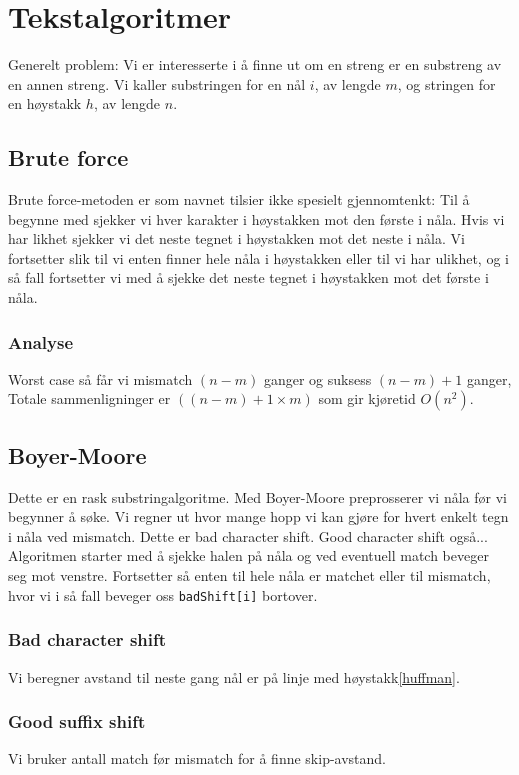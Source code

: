 \section{\color{red}Tekstalgoritmer}
	Generelt problem: Vi er interesserte i å finne ut om en streng er en substreng av en annen streng. Vi kaller substringen for en nål $i$, av lengde $m$, og stringen for en høystakk $h$, av lengde $n$.

	\subsection{Brute force}
		Brute force-metoden er som navnet tilsier ikke spesielt gjennomtenkt: Til å begynne med sjekker vi hver karakter i høystakken mot den første i nåla. Hvis vi har likhet sjekker vi det neste tegnet i høystakken mot det neste i nåla. Vi fortsetter slik til vi enten finner hele nåla i høystakken eller til vi har ulikhet, og i så fall fortsetter vi med å sjekke det neste tegnet i høystakken mot det første i nåla.

	\subsubsection{Analyse}
		Worst case så får vi mismatch $(n-m)$ ganger og suksess $(n-m)+1$ ganger, Totale sammenligninger er $((n-m)+1\times m)$ som gir kjøretid $O(n^2)$.

	\subsection{\color{red}Boyer-Moore}
		Dette er en rask substringalgoritme. Med Boyer-Moore preprosserer vi nåla før vi begynner å søke. Vi regner ut hvor mange hopp vi kan gjøre for hvert enkelt tegn i nåla ved mismatch. Dette er bad character shift. Good character shift også... Algoritmen starter med å sjekke halen på nåla og ved eventuell match beveger seg mot venstre. Fortsetter så enten til hele nåla er matchet eller til mismatch, hvor vi i så fall beveger oss \verb|badShift[i]| bortover.

	\subsubsection{\color{red}Bad character shift}
		Vi beregner avstand til neste gang nål er på linje med høystakk\ref{huffman}.
	\subsubsection{\color{red}Good suffix shift}
		Vi bruker antall match før mismatch for å finne skip-avstand.

